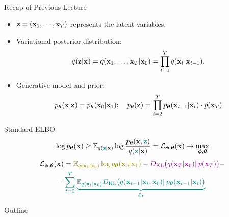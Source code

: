 \documentclass{beamer}
\begin{document}
\begin{frame}{Recap of Previous Lecture}
	\begin{itemize}
		\item $\mathbf{z} = (\mathbf{x}_1, \dots, \mathbf{x}_T)$ represents the latent variables.
		\item Variational posterior distribution:
		\vspace{-0.2cm}
		\[
			q(\mathbf{z} | \mathbf{x}) = q(\mathbf{x}_1, \dots, \mathbf{x}_T | \mathbf{x}_0) = \prod_{t = 1}^T q(\mathbf{x}_t | \mathbf{x}_{t - 1}).
		\]
		\vspace{-0.3cm}
		\item Generative model and prior:
		\vspace{-0.2cm}
		\[
			p_{\boldsymbol{\theta}}(\mathbf{x} | \mathbf{z}) = p_{\boldsymbol{\theta}}(\mathbf{x}_0 | \mathbf{x}_1); \quad 
			p_{\boldsymbol{\theta}}(\mathbf{z}) = \prod_{t=2}^T p_{\boldsymbol{\theta}}(\mathbf{x}_{t - 1} | \mathbf{x}_t) \cdot p(\mathbf{x}_T)
		\]
	\end{itemize}
	\vspace{-0.2cm}
	\begin{block}{Standard ELBO}
		\vspace{-0.2cm}
		\[
			\log p_{\boldsymbol{\theta}}(\mathbf{x}) \geq \mathbb{E}_{q({\color{teal}\mathbf{z}} | \mathbf{x})} \log \frac{p_{\boldsymbol{\theta}}(\mathbf{x}, {\color{teal}\mathbf{z}})}{q({\color{teal}\mathbf{z}} | \mathbf{x})} = \mathcal{L}_{\boldsymbol{\phi}, \boldsymbol{\theta}}(\mathbf{x}) \rightarrow \max_{\boldsymbol{\phi}, \boldsymbol{\theta}}
		\]
		\vspace{-0.5cm}
		\begin{multline*}
			\cL_{\bphi, \btheta}(\bx) =  {\color{olive}\bbE_{q(\bx_1 | \bx_0)} \log \pt(\bx_0 | \bx_1)} - {\color{violet}\KL\bigl(q(\bx_T | \bx_0) \| p(\bx_T)\bigr)} - \\
			- {\color{teal}\sum_{t=2}^T \underbrace{ \bbE_{q(\bx_t | \bx_0)} \KL \bigl(q(\bx_{t-1} | \bx_t, \bx_0) \| \pt(\bx_{t-1} | \bx_t)\bigr)}_{\cL_t}}
		\end{multline*}
	\end{block}
\end{frame}
\begin{frame}{Outline}
    \tableofcontents
\end{frame}
\end{document}

